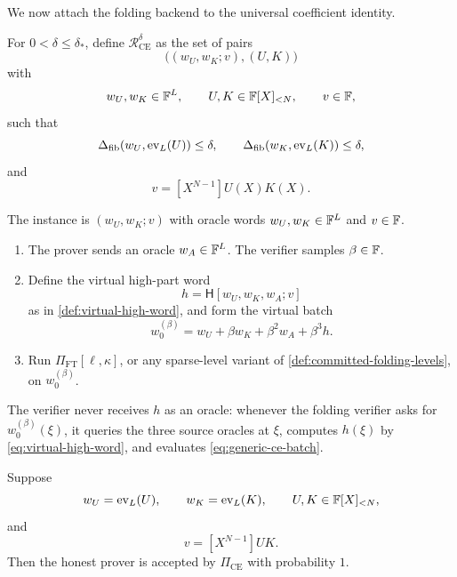 We now attach the folding backend to the universal coefficient identity.

\begin{definition}
\label{def:generic-ce-relation}
For $0<\delta\le\delta_*$, define $\mathcal R^{\delta}_{\mathrm{CE}}$ as the set of pairs
\[
  \bigl((w_U,w_K;v),(U,K)\bigr)
\]
with
\[
  w_U,w_K\in\mathbb{F}^L,
  \qquad
  U,K\in\mathbb{F}[X]_{<N},
  \qquad
  v\in\mathbb{F},
\]
such that
\begin{equation}
  \Delta_{\mathrm{fib}}(w_U,\operatorname{ev}_L(U))\le\delta,
  \qquad
  \Delta_{\mathrm{fib}}(w_K,\operatorname{ev}_L(K))\le\delta,
  \label{eq:generic-ce-distance}
\end{equation}
and
\begin{equation}
  v=[X^{N-1}]U(X)K(X).
  \label{eq:generic-ce-value}
\end{equation}
\end{definition}

\begin{definition}
\label{def:generic-ce-protocol}
The instance is $(w_U,w_K;v)$ with oracle words $w_U,w_K\in\mathbb{F}^L$ and $v\in\mathbb{F}$.
\begin{enumerate}[label=\textnormal{\arabic*.},leftmargin=*]
  \item The prover sends an oracle $w_A\in\mathbb{F}^L$.  The verifier samples $\beta\in\mathbb{F}$.
  \item Define the virtual high-part word
  \begin{equation}
    h=\mathsf H[w_U,w_K,w_A;v]
    \label{eq:generic-ce-high-word}
  \end{equation}
  as in \cref{def:virtual-high-word}, and form the virtual batch
  \begin{equation}
    w_0^{(\beta)}
    =
    w_U+\beta w_K+\beta^2w_A+\beta^3h.
    \label{eq:generic-ce-batch}
  \end{equation}
  \item Run $\Pi_{\mathrm{FT}}[\ell,\kappa]$, or any sparse-level variant of \cref{def:committed-folding-levels}, on $w_0^{(\beta)}$.
\end{enumerate}
The verifier never receives $h$ as an oracle: whenever the folding verifier asks for $w_0^{(\beta)}(\xi)$, it queries the three source oracles at $\xi$, computes $h(\xi)$ by \eqref{eq:virtual-high-word}, and evaluates \eqref{eq:generic-ce-batch}.
\end{definition}

\begin{theorem}
\label{thm:generic-ce-completeness}
Suppose
\[
  w_U=\operatorname{ev}_L(U),
  \qquad
  w_K=\operatorname{ev}_L(K),
  \qquad
  U,K\in\mathbb{F}[X]_{<N},
\]
and
\[
  v=[X^{N-1}]UK.
\]
Then the honest prover is accepted by $\Pi_{\mathrm{CE}}$ with probability $1$.
\end{theorem}

